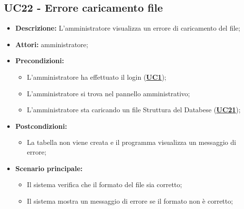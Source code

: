 \subsection{UC22 - Errore caricamento file}
\label{sec:UC22}
\begin{itemize}
	\item \textbf{Descrizione:} L’amministratore visualizza un errore di caricamento del file;
	\item \textbf{Attori:} amministratore;
	\item \textbf{Precondizioni:} 
	\begin{itemize}
		\item L’amministratore ha effettuato il login (\hyperref[sec:UC1]{\textbf{UC1}});
		\item L’amministratore si trova nel pannello amministrativo;
		\item L’amministratore sta caricando un file Struttura del Databese (\hyperref[sec:UC21]{\textbf{UC21}});
	\end{itemize}
	\item \textbf{Postcondizioni:} 
	\begin{itemize}
		\item La tabella non viene creata e il programma visualizza un messaggio di errore;
	\end{itemize}
	\item \textbf{Scenario principale:} 
	\begin{itemize}
		\item Il sistema verifica che il formato del file sia corretto;
		\item Il sistema mostra un messaggio di errore se il formato non è corretto;
	\end{itemize}
\end{itemize}


